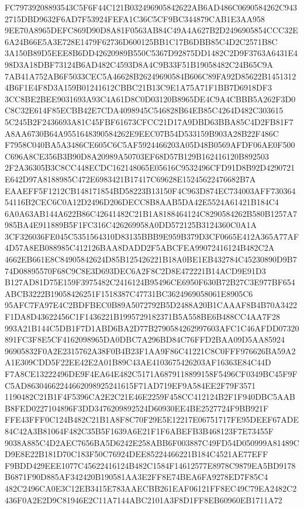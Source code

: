 \documentclass[UTF8,fontset=fandol,zihao=-4,a4paper]{ctexart}
\begin{document}
{{FC79739208893543C5F6F44C121B032496905842622AB6AD486C0690584262C9432715DBD9632F6AD7F53924FEFA1C36C5CF9BC344879CAB1E3AA958
9EE70A8965DEFC869D90D8A81F0563AB84C49A4A627B2D2496905854CCC32E6A24B66E5A3E728E1479F62736D600125BB1C17B6DBB85C4D2C2571B8C
3A150B89D5EEE8B6DD42620989B550C5367D92875DD1482C2D9F3763A6431E498D3A18DBF73124B6AD482C4593D8A4C9B33F51B19058482C24B65C9A
7AB41A752AB6F5033CEC5A46628B26249690584B606C89FA92D85622B14513124B6F1E4F8D3A159B01241612CBBC21B13C9E1A75A71F1BB7D6918DF3
3CC8BE2BEE9031693A93C4A61D8C0D03120B8965DE4C9A4CBBB5A262F3D0C8C32E614F85ECBB42E7CDA4098945C546828B64EB85C4264D482C303615
5C245B2F2436693A81C45FBF61673CFCC21D17A9DBD63BBA85C4D2FB81F7A8AA6730B64A9551648390584262E9EEC07B54D533159B903A28B22F486C
F7958C040BA5A3486CE605C6C5AF5924466203A05D48B0569AFDF06AE0F500C696A8CE356B3B90D8A20989A50703EF68D57B129B162416120B892503
2F2A36305B3C8CC448ECDC162148065E05616C9532496CFD91D8B92D4290721E642D97A8188985C472E6983421B17417C69628E15245622476682B7A
EAAEFF5F1212CB148171854BD58223B13150F4C963D874EC734003AFF73036454116B2CEC6C0A12D2496D206DECC8B8AAB5DA42E5524A61421B184C4
6A0A63AB144A622B86C42641482C21B1A8188464124C8290584262B580B1257A7985BA4E911889B5F1FC316C426269958A0DD572125B3124360C0A1A
3CF326036FE045C5351564310D83135BBB9E959B379D3CF0665E412A365A77AF4D57A8EB088985C412126BAA8DADD2F5ABCFEA99072416124B482C2A
4662EB661E8C84905842624D85B125426221B18A0BE1EB432784C45230890D9B774D08895570F68C9C8E3D693DEC6A2F8C2D8E472221B14ACD9E91D3
B127AD81D75E159F3975482C2416124B95496CE6950F630B72B27C3E977BF654ABCB3222B19058426251F1518387C47731BC3624969058061E8905C6
95AFC7FA97E4C2BDFBEC0B89A5072792B5D2488A20B1CAAAF8B4B70A3422F1DA8D43622456C1F1436221B1995729182371B5A558BE6B488CC4AA7F28
993A21B144C5DB1F7D1ABD6BA2D77B2790584262997603AFC1C46AFDD07320891FC3F8E5CF4162098965DA0DBC7A296BD84C76FFD2BAA09D5AA85924
96905832F0A2E2315762A38F0B4B23F1AA9F86C41221C8C0FFF976626BA59A2A1E309CDD5F22EE42E2A01B89C43AE4103675426203AF16363E84C44D
F7A8CE13222496DE9F4EA64E482C5171A6879118899158F5496CF0349BC45F9FC5AD86304662244662098925241615F71AD719EF9A584EE2F79F3571
1190482C21B1F4F5396CA2E2C21E46E2259F458CC412124B2F1F940DBC5AABB8FED0227104896F3DD3476209892524D60930EE4BE2527724F9BB921F
FFE43FFF0C124B482C21B1A8F8C70F29E5E12217E06751717FE95DEEF67ADE84C42A3B81064F482C35B5F1639A6E21F1F6ABEFB3B468123F7E73455F
9038A885C4D2AEC7656BA5D6242E258ABB6F003887C49FD54D050999A81489CD9E8E22B181D70C183F50C76924DEE85224466221B184C4521AE77EFF
F9BDD429EEE1077C45622416124B482C1584F14612577E8978C9879EA5BD9178B6871F90D885AF342420B190581AA3E2FF8E74BEA6FA9278ED7F85C4
482C2496CA0E3C12EB3415E783AAECBB261EAF06121FF8EC49C79EA2482C2436F0A2E2D9C81946E2C11A7144ABC2101A3F8D1FF8EB60960EB1711A72
}}
\end{document}
